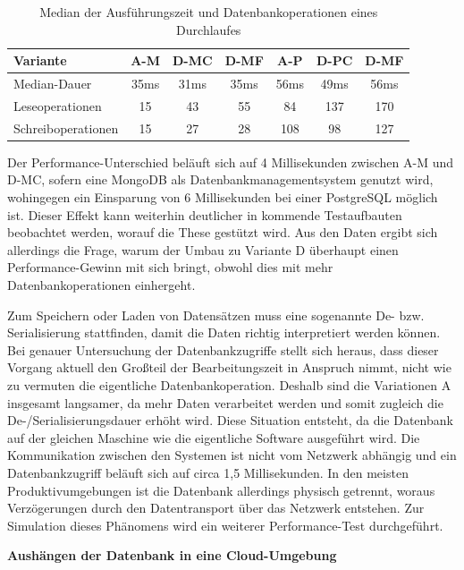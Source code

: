 \begin{table}
	\centering
	\begin{tabular}{ | >{\raggedright\arraybackslash}m{} || c | c | c | c | c | c | } 
		\hline
		Variante & A-M & D-MC & D-MF & A-P & D-PC & D-MF \\ 
		\hline
		Median-Dauer & 35ms & 31ms & 35ms & 56ms & 49ms & 56ms \\
		\hline
		Leseoperationen & 15 & 43 &  55 &  84 & 137 & 170 \\
		\hline
		Schreiboperationen & 15 & 27 & 28 & 108 & 98 & 127 \\
		\hline
	\end{tabular}
	\caption{Median der Ausführungszeit und Datenbankoperationen eines Durchlaufes}
	\label{fig:durationofexecution}
\end{table}

Der Performance-Unterschied beläuft sich auf 4 Millisekunden zwischen A-M und D-MC, sofern eine MongoDB als Datenbankmanagementsystem genutzt wird, wohingegen ein Einsparung von 6 Millisekunden bei einer PostgreSQL möglich ist. Dieser Effekt kann weiterhin deutlicher in kommende Testaufbauten beobachtet werden, worauf die These gestützt wird. Aus den Daten ergibt sich allerdings die Frage, warum der Umbau zu Variante D überhaupt einen Performance-Gewinn mit sich bringt, obwohl dies mit mehr Datenbankoperationen einhergeht. 

Zum Speichern oder Laden von Datensätzen muss eine sogenannte De- bzw. \Gls{Serialisierung} stattfinden, damit die Daten richtig interpretiert werden können. Bei genauer Untersuchung der Datenbankzugriffe stellt sich heraus, dass dieser Vorgang aktuell den Großteil der Bearbeitungszeit in Anspruch nimmt, nicht wie zu vermuten die eigentliche Datenbankoperation. Deshalb sind die Variationen A insgesamt langsamer, da mehr Daten verarbeitet werden und somit zugleich die De-/Serialisierungsdauer erhöht wird. Diese Situation entsteht, da die Datenbank auf der gleichen Maschine wie die eigentliche Software ausgeführt wird. Die Kommunikation zwischen den Systemen ist nicht vom Netzwerk abhängig und ein Datenbankzugriff beläuft sich auf circa 1,5 Millisekunden. In den meisten Produktivumgebungen ist die Datenbank allerdings physisch getrennt, woraus Verzögerungen durch den Datentransport über das Netzwerk entstehen. Zur Simulation dieses Phänomens wird ein weiterer Performance-Test durchgeführt. 

\textbf{Aushängen der Datenbank in eine Cloud-Umgebung}


